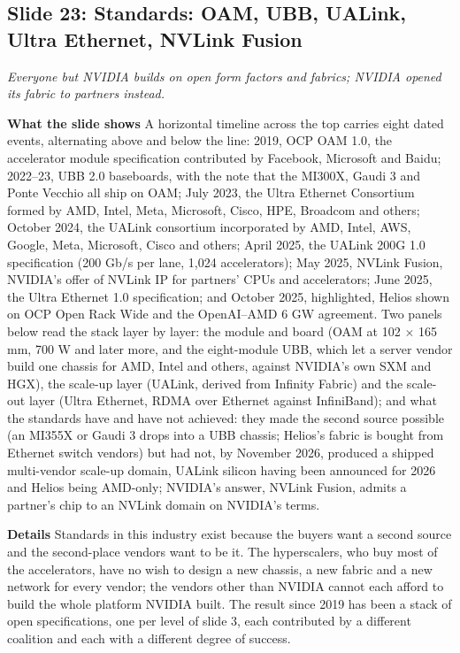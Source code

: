 \documentclass[11pt,letterpaper]{article}
\newcommand{\slide}[3]{%
  \subsection[Slide #1: #2]{Slide #1: #2}%
  {\color{muted}\itshape #3\par}\medskip}
\newcommand{\para}[1]{\medskip\noindent\textbf{#1}\quad}
\begin{document}
\slide{23}{Standards: OAM, UBB, UALink, Ultra Ethernet, NVLink Fusion}{Everyone but NVIDIA builds on open form factors and fabrics; NVIDIA opened its fabric to partners instead.}

\para{What the slide shows} A horizontal timeline across the top carries eight dated events, alternating above and below the line: 2019, OCP OAM 1.0, the accelerator module specification contributed by Facebook, Microsoft and Baidu; 2022--23, UBB 2.0 baseboards, with the note that the MI300X, Gaudi 3 and Ponte Vecchio all ship on OAM; July 2023, the Ultra Ethernet Consortium formed by AMD, Intel, Meta, Microsoft, Cisco, HPE, Broadcom and others; October 2024, the UALink consortium incorporated by AMD, Intel, AWS, Google, Meta, Microsoft, Cisco and others; April 2025, the UALink 200G 1.0 specification (200 Gb/s per lane, 1{,}024 accelerators); May 2025, NVLink Fusion, NVIDIA's offer of NVLink IP for partners' CPUs and accelerators; June 2025, the Ultra Ethernet 1.0 specification; and October 2025, highlighted, Helios shown on OCP Open Rack Wide and the OpenAI--AMD 6 GW agreement. Two panels below read the stack layer by layer: the module and board (OAM at 102 $\times$ 165 mm, 700 W and later more, and the eight-module UBB, which let a server vendor build one chassis for AMD, Intel and others, against NVIDIA's own SXM and HGX), the scale-up layer (UALink, derived from Infinity Fabric) and the scale-out layer (Ultra Ethernet, RDMA over Ethernet against InfiniBand); and what the standards have and have not achieved: they made the second source possible (an MI355X or Gaudi 3 drops into a UBB chassis; Helios's fabric is bought from Ethernet switch vendors) but had not, by November 2026, produced a shipped multi-vendor scale-up domain, UALink silicon having been announced for 2026 and Helios being AMD-only; NVIDIA's answer, NVLink Fusion, admits a partner's chip to an NVLink domain on NVIDIA's terms.

\para{Details} Standards in this industry exist because the buyers want a second source and the second-place vendors want to be it. The hyperscalers, who buy most of the accelerators, have no wish to design a new chassis, a new fabric and a new network for every vendor; the vendors other than NVIDIA cannot each afford to build the whole platform NVIDIA built. The result since 2019 has been a stack of open specifications, one per level of slide 3, each contributed by a different coalition and each with a different degree of success.
\end{document}
